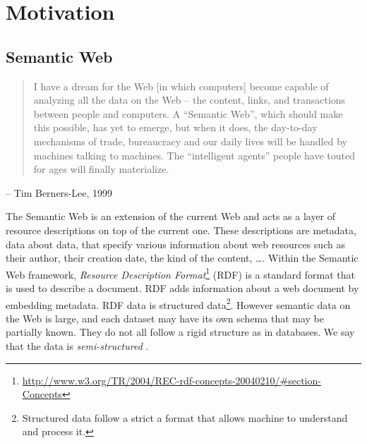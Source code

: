 \section{Motivation}

\subsection{Semantic Web}

\begin{framed}
\begin{quote}
I have a dream for the Web [in which computers] become capable of analyzing
all the data on the Web – the content, links, and transactions between people
and computers. A ``Semantic Web'', which should make this possible, has yet to
emerge, but when it does, the day-to-day mechanisms of trade, bureaucracy and
our daily lives will be handled by machines talking to machines. The
``intelligent agents'' people have touted for ages will finally materialize.
\end{quote}
– Tim Berners-Lee, 1999
\end{framed}

The Semantic Web is an extension of the current Web and acts as a layer of
resource descriptions on top of the current one. These descriptions are
metadata, data about data, that specify various information about web
resources such as their author, their creation date, the kind of the content,
\ldots. Within the Semantic Web framework, \emph{Resource Description
Format}\footnote{\url{http://www.w3.org/TR/2004/REC-rdf-concepts-20040210/\#section-Concepts}}
(RDF) is a standard format that is used to describe a document. RDF adds
information about a web document by embedding metadata. RDF data is structured
data\footnote{Structured data follow a strict a format that allows machine to
understand and process it.}. However semantic data on the Web is large, and each
dataset may have its own schema that may be partially known. They do not all
follow a rigid structure as in databases. We say that the data is
\emph{semi-structured} \cite{abiteboul:1997:icdt}.

